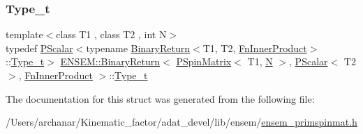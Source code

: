 \subsubsection{\texorpdfstring{Type\_t}{Type\_t}\hspace{0.1cm}{\footnotesize\ttfamily [2/2]}}
{\footnotesize\ttfamily template$<$class T1 , class T2 , int N$>$ \\
typedef \mbox{\hyperlink{classENSEM_1_1PScalar}{P\+Scalar}}$<$typename \mbox{\hyperlink{structENSEM_1_1BinaryReturn}{Binary\+Return}}$<$T1, T2, \mbox{\hyperlink{structENSEM_1_1FnInnerProduct}{Fn\+Inner\+Product}}$>$\+::\mbox{\hyperlink{structENSEM_1_1BinaryReturn_3_01PSpinMatrix_3_01T1_00_01N_01_4_00_01PScalar_3_01T2_01_4_00_01FnInnerProduct_01_4_a8e05175a101de1a37766b92365e8612a}{Type\+\_\+t}}$>$ \mbox{\hyperlink{structENSEM_1_1BinaryReturn}{E\+N\+S\+E\+M\+::\+Binary\+Return}}$<$ \mbox{\hyperlink{classENSEM_1_1PSpinMatrix}{P\+Spin\+Matrix}}$<$ T1, \mbox{\hyperlink{operator__name__util_8cc_a7722c8ecbb62d99aee7ce68b1752f337}{N}} $>$, \mbox{\hyperlink{classENSEM_1_1PScalar}{P\+Scalar}}$<$ T2 $>$, \mbox{\hyperlink{structENSEM_1_1FnInnerProduct}{Fn\+Inner\+Product}} $>$\+::\mbox{\hyperlink{structENSEM_1_1BinaryReturn_3_01PSpinMatrix_3_01T1_00_01N_01_4_00_01PScalar_3_01T2_01_4_00_01FnInnerProduct_01_4_a8e05175a101de1a37766b92365e8612a}{Type\+\_\+t}}}



The documentation for this struct was generated from the following file\+:\begin{DoxyCompactItemize}
\item 
/\+Users/archanar/\+Kinematic\+\_\+factor/adat\+\_\+devel/lib/ensem/\mbox{\hyperlink{lib_2ensem_2ensem__primspinmat_8h}{ensem\+\_\+primspinmat.\+h}}\end{DoxyCompactItemize}
